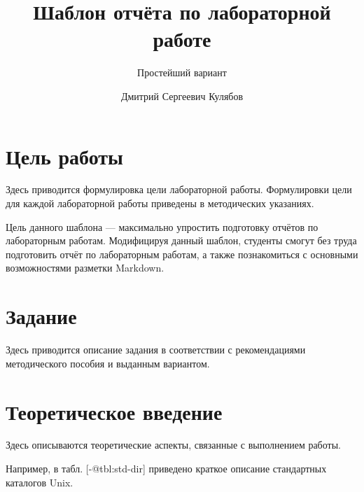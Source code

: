 \documentclass[
  12pt,
  a4paper,
]{scrreprt}
\title{Шаблон отчёта по лабораторной работе}
\subtitle{Простейший вариант}
\author{Дмитрий Сергеевич Кулябов}
\date{}
\begin{document}
\maketitle

\renewcommand*\contentsname{Содержание}
{
\setcounter{tocdepth}{2}
\tableofcontents
}
\listoffigures
\listoftables
{}
\chapter{Цель
работы}\label{ux446ux435ux43bux44c-ux440ux430ux431ux43eux442ux44b}

Здесь приводится формулировка цели лабораторной работы. Формулировки
цели для каждой лабораторной работы приведены в методических указаниях.

Цель данного шаблона --- максимально упростить подготовку отчётов по
лабораторным работам. Модифицируя данный шаблон, студенты смогут без
труда подготовить отчёт по лабораторным работам, а также познакомиться с
основными возможностями разметки Markdown.

\chapter{Задание}\label{ux437ux430ux434ux430ux43dux438ux435}

Здесь приводится описание задания в соответствии с рекомендациями
методического пособия и выданным вариантом.

\chapter{Теоретическое
введение}\label{ux442ux435ux43eux440ux435ux442ux438ux447ux435ux441ux43aux43eux435-ux432ux432ux435ux434ux435ux43dux438ux435}

Здесь описываются теоретические аспекты, связанные с выполнением работы.

Например, в табл. {[}-@tbl:std-dir{]} приведено краткое описание
стандартных каталогов Unix.
\end{document}
